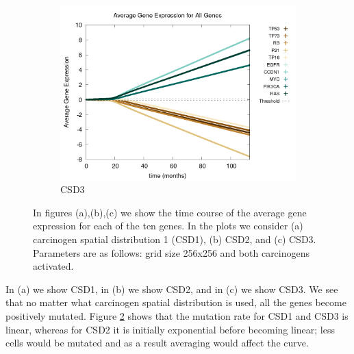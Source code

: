 \documentclass[\main/thesis.tex]{subfiles}
\begin{document}
\begin{figure}[H]
	\begin{subfigure}[t]{.6\textwidth}
		\centering
		\includegraphics[width=\textwidth]{images/4_CarcinFunc/Fig3/geneExprAll_all_Func3.png}
		\caption{CSD3}
		\label{fig:CarcinFunc_geneExpr_Func3}
	\end{subfigure}
	\caption{In figures (a),(b),(c) we show the time course of the average gene expression for each of the ten genes. In the plots we consider (a) carcinogen spatial distribution 1 (CSD1), (b) CSD2, and (c) CSD3. Parameters are as follows: grid size 256x256 and both carcinogens activated.}
	\label{fig:CarcinFunc_geneExpr}
\end{figure}
In (a) we show CSD1, in (b) we show CSD2, and in (c) we show CSD3. We see that no matter what carcinogen spatial distribution is used, all the genes become positively mutated. Figure \ref{fig:CarcinFunc_geneExpr} shows that the mutation rate for CSD1 and CSD3 is linear, whereas for CSD2 it is initially exponential before becoming linear; less cells would be mutated and as a result averaging would affect the curve. 
\end{document}
